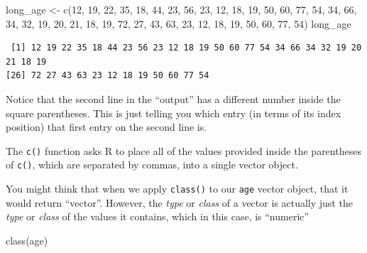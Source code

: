 \documentclass[
  letterpaper,
  DIV=11,
  numbers=noendperiod]{scrreprt}
\newenvironment{Shaded}{\begin{snugshade}}{\end{snugshade}}
\newcommand{\DecValTok}[1]{\textcolor[rgb]{0.68,0.00,0.00}{#1}}
\newcommand{\FunctionTok}[1]{\textcolor[rgb]{0.28,0.35,0.67}{#1}}
\newcommand{\NormalTok}[1]{\textcolor[rgb]{0.00,0.23,0.31}{#1}}
\newcommand{\OtherTok}[1]{\textcolor[rgb]{0.00,0.23,0.31}{#1}}
\begin{document}
\begin{Shaded}
\begin{Highlighting}[]
\NormalTok{long\_age }\OtherTok{\textless{}{-}} \FunctionTok{c}\NormalTok{(}\DecValTok{12}\NormalTok{, }\DecValTok{19}\NormalTok{, }\DecValTok{22}\NormalTok{, }\DecValTok{35}\NormalTok{, }\DecValTok{18}\NormalTok{, }\DecValTok{44}\NormalTok{, }\DecValTok{23}\NormalTok{, }\DecValTok{56}\NormalTok{, }\DecValTok{23}\NormalTok{, }\DecValTok{12}\NormalTok{, }\DecValTok{18}\NormalTok{, }\DecValTok{19}\NormalTok{, }\DecValTok{50}\NormalTok{, }\DecValTok{60}\NormalTok{, }\DecValTok{77}\NormalTok{, }\DecValTok{54}\NormalTok{, }
              \DecValTok{34}\NormalTok{, }\DecValTok{66}\NormalTok{, }\DecValTok{34}\NormalTok{, }\DecValTok{32}\NormalTok{, }\DecValTok{19}\NormalTok{, }\DecValTok{20}\NormalTok{, }\DecValTok{21}\NormalTok{, }\DecValTok{18}\NormalTok{, }\DecValTok{19}\NormalTok{, }\DecValTok{72}\NormalTok{, }\DecValTok{27}\NormalTok{, }\DecValTok{43}\NormalTok{, }\DecValTok{63}\NormalTok{, }\DecValTok{23}\NormalTok{, }\DecValTok{12}\NormalTok{, }\DecValTok{18}\NormalTok{, }
              \DecValTok{19}\NormalTok{, }\DecValTok{50}\NormalTok{, }\DecValTok{60}\NormalTok{, }\DecValTok{77}\NormalTok{, }\DecValTok{54}\NormalTok{)}
\NormalTok{long\_age}
\end{Highlighting}
\end{Shaded}

\begin{verbatim}
 [1] 12 19 22 35 18 44 23 56 23 12 18 19 50 60 77 54 34 66 34 32 19 20 21 18 19
[26] 72 27 43 63 23 12 18 19 50 60 77 54
\end{verbatim}

Notice that the second line in the ``output'' has a different number
inside the square parentheses. This is just telling you which entry (in
terms of its index position) that first entry on the second line is.

The \texttt{c()} function asks R to place all of the values provided
inside the parentheses of \texttt{c()}, which are separated by commas,
into a single vector object.

You might think that when we apply \texttt{class()} to our \texttt{age}
vector object, that it would return ``vector''. However, the \emph{type}
or \emph{class} of a vector is actually just the \emph{type} or
\emph{class} of the values it contains, which in this case, is
``numeric''

\begin{Shaded}
\begin{Highlighting}[]
\FunctionTok{class}\NormalTok{(age)}
\end{Highlighting}
\end{Shaded}
\end{document}

